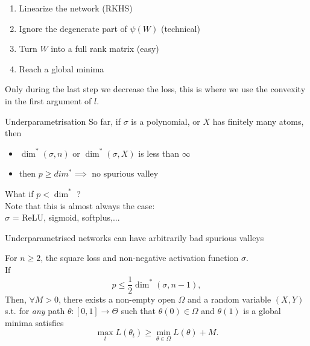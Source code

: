 \documentclass{beamer}
\begin{document}
\begin{frame}
	\begin{enumerate}
		\item Linearize the network (RKHS)
		\item Ignore the degenerate part of $\psi(W)$ (technical)
		\item Turn $W$ into a full rank matrix (easy)
		\item Reach a global minima
	\end{enumerate}
	Only during the last step we decrease the loss, this is where we use the convexity in the first argument of $l$.

\end{frame}

\begin{frame}{Underparametrisation}
	So far, if $\sigma$ is a polynomial, or $X$ has finitely many atoms, then
	\begin{itemize}
		\item $\dim^*(\sigma, n)$ or $\dim^*(\sigma, X)$ is less than $\infty$
		\item then $p\geq dim^*\implies$ no spurious valley 
	\end{itemize}
	What if $p<\dim^*$ ? \\
	Note that this is almost always the case:\\
	$\sigma$ = ReLU, sigmoid, softplus,...
\end{frame}

\begin{frame}{Underparametrised networks can have arbitrarily bad spurious valleys}
	\begin{theorem}
		For $n\geq 2$, the square loss and non-negative activation function $\sigma$.\\
		If 
		\begin{equation*}
			p \leq \frac{1}{2}\dim^*(\sigma, n-1),
		\end{equation*}
		Then, $\forall M>0$, there exists a non-empty open $\Omega$ and a random variable $(X,Y)$ s.t. for \emph{any} path $\theta:[0,1]\to \Theta$ such that $\theta(0) \in\Omega$ and $\theta(1)$ is a global minima satisfies
		\begin{equation*}
			\max_t L(\theta_t) \geq \min_{\theta\in\Omega} L(\theta) + M.
		\end{equation*} 
	\end{theorem}
\end{frame}
\end{document}
